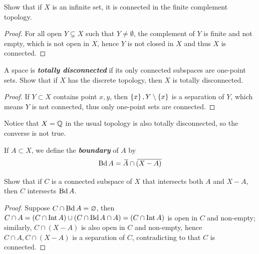 \documentclass[12pt,a4paper]{article}
\begin{document}
    \begin{ex}
        Show that if $X$ is an infinite set, it is connected in the finite complement topology.
    \end{ex}
    \begin{proof}
        For all open $Y\subsetneq X$ such that $Y\neq\emptyset$, the complement of $Y$ is finite and not empty, which is not open in $X$, hence $Y$ is not closed in $X$ and thus $X$ is connected.
    \end{proof}
    \hfill

    \begin{ex}
        A space is \textbf{\textit{totally disconnected}} if its only connected subspaces are one-point sets. Show that if $X$ has the discrete topology, then $X$ is totally disconnected.
    \end{ex}
    \begin{proof}
        If $Y\subset X$ contains point $x,y$, then $\left\{x\right\},Y\setminus\left\{x\right\}$ is a separation of $Y$, which means $Y$ is not connected, thus only one-point sets are connected.
    \end{proof}
    \begin{remark}
        Notice that $X=\mathbb{Q}$ in the usual topology is also totally disconnected, so the converse is not true.
    \end{remark}
    \hfill

    \begin{ex}\addelement{$\Bd$}
        If $A\subset X$, we define the \textbf{\textit{boundary}} of $A$ by
        $$
        \operatorname{Bd} A={}\mkern3mu\overline{\mkern-3muA}\cap{}\mkern3mu\overline{\mkern-3mu(X-A)}
        $$

        Show that if $C$ is a connected subspace of $X$ that intersects both $A$ and $X-A$, then $C$ intersects $\operatorname{Bd} A$.
    \end{ex}
    \begin{proof}
        Suppose $C\cap\operatorname{Bd} A=\varnothing$, then $C\cap A=(C\cap\mathrm{Int\,} A)\cup(C\cap\operatorname{Bd} A\cap A)=(C\cap\mathrm{Int\,} A)$ is open in $C$ and non-empty; similarly, $C\cap(X-A)$ is also open in $C$ and non-empty, hence $C\cap A,C\cap(X-A)$ is a separation of $C$, contradicting to that $C$ is connected.
    \end{proof}
    \hfill
\end{document}
